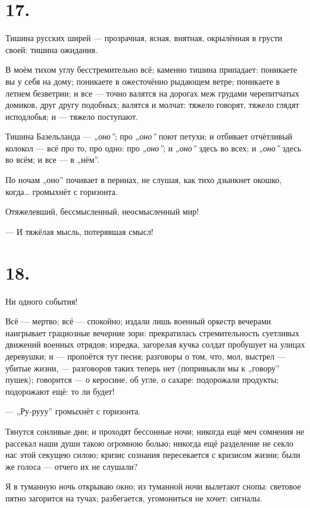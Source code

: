 \documentclass[12pt,a4paper,oneside]{book}
\begin{document}
\section*{17.}

Тишина русских ширей — прозрачная, ясная, внятная, окрылённая в грусти своей: тишина ожидания.

В моём тихом углу бесстремительно всё; каменно тишина припадает: поникаете вы у себя на дому; поникаете в ожесточённо рыдающем ветре; поникаете в летнем безветрии; и все — точно валятся на дорогах меж грудами черепитчатых домиков, друг другу подобных; валятся и молчат: тяжело говорят, тяжело глядят исподлобья; и — тяжело поступают.

Тишина Базельланда — \emph{„оно”}; про \emph{„оно”} поют петухи; и отбивает отчётливый колокол — всё про то, про одно: про \emph{„оно”}; и \emph{„оно”} здесь во всех; и \emph{„оно”} здесь во всём; и все — в „нём”.

По ночам „оно” почивает в перинах, не слушая, как тихо дзынкнет окошко, когда… громыхнёт с горизонта.

Отяжелевший, бессмысленный, неосмысленный мир!

— И тяжёлая мысль, потерявшая смысл!

\section*{18.}

Ни одного события!

Всё — мертво; всё — спокойно; издали лишь военный оркестр вечерами наигрывает грациозные вечерние зори: прекратилась стремительность суетливых движений военных отрядов; изредка, загорелая кучка солдат пробушует на улицах деревушки; и — пропоётся тут песня; разговоры о том, что, мол, выстрел — убитые жизни, — разговоров таких теперь нет (попривыкли мы к „говору” пушек); говорится — о керосине, об угле, о сахаре: подорожали продукты; подорожают ещё: то ли будет!

— „Ру-рууу” громыхнёт с горизонта.

Тянутся сонливые дни; и проходят бессонные ночи; никогда ещё меч сомнения не рассекал наши души такою огромною болью; никогда ещё разделение не секло нас этой секущею силою; кризис сознания пересекается с кризисом жизни; были же голоса — отчего их не слушали?

Я в туманную ночь открываю окно; из туманной ночи вылетают снопы: световое пятно загорится на тучах; разбегается, угомониться не хочет: сигналы.
\end{document}
